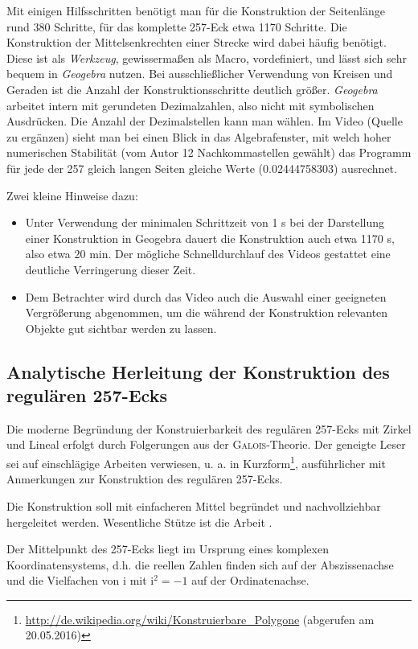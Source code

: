 \documentclass[11pt]{article}
\newcommand{\ii}{\mathrm{i}}
\begin{document}
Mit einigen Hilfsschritten benötigt man für die Konstruktion der Seitenlänge
rund 380 Schritte, für das komplette 257-Eck etwa 1170 Schritte. Die
Konstruktion der Mittelsenkrechten einer Strecke wird dabei häufig benötigt.
Diese ist als \emph{Werkzeug}, gewissermaßen als Macro, vordefiniert, und
lässt sich sehr bequem in \emph{Geogebra} nutzen. Bei ausschließlicher
Verwendung von Kreisen und Geraden ist die Anzahl der Konstruktionsschritte
deutlich größer. \emph{Geogebra} arbeitet intern mit gerundeten Dezimalzahlen,
also nicht mit symbolischen Ausdrücken. Die Anzahl der Dezimalstellen kann man
wählen. Im Video (Quelle zu ergänzen) sieht man bei einen Blick in das
Algebrafenster, mit welch hoher numerischen Stabilität (vom Autor 12
Nachkommastellen gewählt) das Programm für jede der 257 gleich langen Seiten
gleiche Werte (0.02444758303) ausrechnet.

Zwei kleine Hinweise dazu:
\begin{itemize}[noitemsep]
\item Unter Verwendung der minimalen Schrittzeit von 1 s bei der Darstellung
  einer Konstruktion in Geogebra dauert die Konstruktion auch etwa 1170 s,
  also etwa 20 min. Der mögliche Schnelldurchlauf des Videos gestattet eine
  deutliche Verringerung dieser Zeit.
\item Dem Betrachter wird durch das Video auch die Auswahl einer geeigneten
  Vergrößerung abgenommen, um die während der Konstruktion relevanten Objekte
  gut sichtbar werden zu lassen.
\end{itemize}

\subsection*{Analytische Herleitung der Konstruktion des regulären 257-Ecks}

Die moderne Begründung der Konstruierbarkeit des regulären 257-Ecks mit Zirkel
und Lineal erfolgt durch Folgerungen aus der \textsc{Galois}-Theorie. Der
geneigte Leser sei auf einschlägige Arbeiten verwiesen, u. a. in
Kurzform\footnote{\url{http://de.wikipedia.org/wiki/Konstruierbare_Polygone}
  (abgerufen am 20.05.2016)}, ausführlicher \cite{Bishop1978} mit Anmerkungen
zur Konstruktion des regulären 257-Ecks.

Die Konstruktion soll mit einfacheren Mittel begründet und nachvollziehbar
hergeleitet werden. Wesentliche Stütze ist die Arbeit \cite{deTemple1991}.

Der Mittelpunkt des 257-Ecks liegt im Ursprung eines komplexen
Koordinatensystems, d.h. die reellen Zahlen finden sich auf der Abszissenachse
und die Vielfachen von $\ii$ mit $\ii^{2}=-1$ auf der Ordinatenachse.
\end{document}
